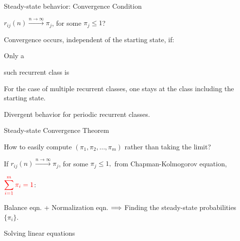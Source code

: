 \begin{frame}{Steady-state behavior: Convergence Condition}

{
\plitemsep 0.1in

\bci
\item $r_{ij}(n) \xrightarrow{n \rightarrow \infty} \pi_j$, for some $\pi_j \le 1$?

\item Convergence occurs, independent of the starting state, if:
\bce[\bf C1.]
\item<2-> Only a 
\item<4-> such recurrent class is 
\ece

\item<3->[\small\bf C1.] {\small For the case of multiple recurrent classes, one stays at the class including the starting state.} 

\item<5->[\small \bf C2.] {\small Divergent behavior for periodic recurrent classes. }

\eci

}
{
\centering
{}
}

\end{frame}


\begin{frame}{Steady-state Convergence Theorem}

   How to easily compute $(\pi_1, \pi_2, \ldots, \pi_m)$
  rather than taking the limit?
  
\plitemsep 0.1in
\bci
\item<2-> If $r_{ij}(n) \xrightarrow{n \rightarrow \infty} \pi_j$, for
  some $\pi_j \le 1,$ from Chapman-Kolmogorov equation, 

\item<5-> $
\displaystyle {\color{red} \sum_{i=1}^m \pi_i = 1}
$: 

\item<6-> Balance eqn. + Normalization eqn. $\Longrightarrow$  Finding the steady-state probabilities $\{\pi_i \}.$
  \bci
  \item Solving linear equations
    \eci
  
\eci


\end{frame}



